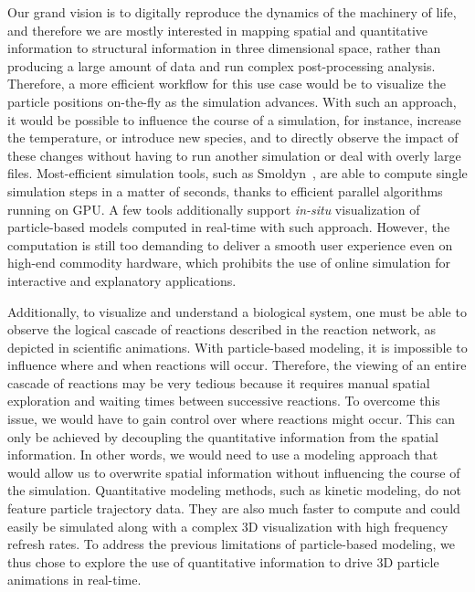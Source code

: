 Our grand vision is to digitally reproduce the dynamics of the machinery of life, and therefore we are mostly interested in mapping spatial and quantitative information to structural information in three dimensional space, rather than producing a large amount of data and run complex post-processing analysis.
Therefore, a more efficient workflow for this use case would be to visualize the particle positions on-the-fly as the simulation advances.
With such an approach, it would be possible to influence the course of a simulation, for instance, increase the temperature, or introduce new species, and to directly observe the impact of these changes without having to run another simulation or deal with overly large files.
Most-efficient simulation tools, such as Smoldyn~\cite{andrews2010detailed}, are able to compute single simulation steps in a matter of seconds, thanks to efficient parallel algorithms running on GPU.
A few tools additionally support \textit{in-situ} visualization of particle-based models computed in real-time with such approach.
However, the computation is still too demanding to deliver a smooth user experience even on high-end commodity hardware, which prohibits the use of online simulation for interactive and explanatory applications.

Additionally, to visualize and understand a biological system, one must be able to observe the logical cascade of reactions described in the reaction network, as depicted in scientific animations.
With particle-based modeling, it is impossible to influence where and when reactions will occur.
Therefore, the viewing of an entire cascade of reactions may be very tedious because it requires manual spatial exploration and waiting times between successive reactions.
To overcome this issue, we would have to gain control over where reactions might occur.
This can only be achieved by decoupling the quantitative information from the spatial information.
In other words, we would need to use a modeling approach that would allow us to overwrite spatial information without influencing the course of the simulation.
Quantitative modeling methods, such as kinetic modeling, do not feature particle trajectory data.
They are also much faster to compute and could easily be simulated along with a complex 3D visualization with high frequency refresh rates.
To address the previous limitations of particle-based modeling, we thus chose to explore the use of quantitative information to drive 3D particle animations in real-time.

